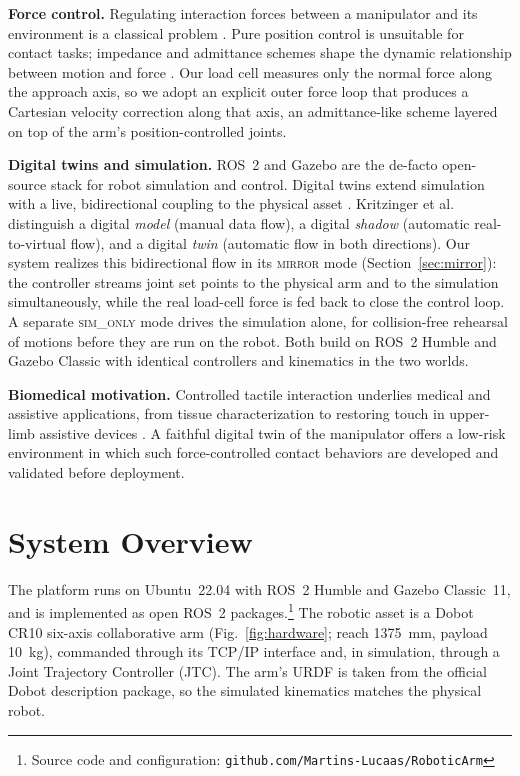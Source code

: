 \documentclass[conference]{IEEEtran}
\begin{document}
\textbf{Force control.} Regulating interaction forces between a manipulator and
its environment is a classical problem \cite{siciliano2009,hogan1985,villani2016}. Pure
position control is unsuitable for contact tasks; impedance and admittance
schemes shape the dynamic relationship between motion and force
\cite{hogan1985}. Our load cell measures only the normal force along the
approach axis, so we adopt an explicit outer force loop that produces a Cartesian
velocity correction along that axis, an admittance-like scheme layered on top of
the arm's position-controlled joints.

\textbf{Digital twins and simulation.} ROS~2 \cite{macenski2022} and Gazebo
\cite{koenig2004} are the de-facto open-source stack for robot simulation and
control. Digital twins extend simulation with a live, bidirectional coupling to
the physical asset \cite{grieves2017,tao2019}. Kritzinger et al.
\cite{kritzinger2018} distinguish a digital \emph{model} (manual data flow), a
digital \emph{shadow} (automatic real-to-virtual flow), and a digital \emph{twin}
(automatic flow in both directions). Our system realizes this bidirectional flow
in its \textsc{mirror} mode (Section~\ref{sec:mirror}): the controller streams
joint set points to the physical arm and to the simulation simultaneously, while
the real load-cell force is fed back to close the control loop. A separate
\textsc{sim\_only} mode drives the simulation alone, for collision-free rehearsal
of motions before they are run on the robot. Both build on ROS~2 Humble and
Gazebo Classic with identical controllers and kinematics in the two worlds.

\textbf{Biomedical motivation.} Controlled tactile interaction underlies medical
and assistive applications, from tissue characterization to restoring touch in
upper-limb assistive devices \cite{antfolk2013}. A faithful digital twin of the
manipulator offers a low-risk environment in which such force-controlled contact
behaviors are developed and validated before deployment.

\section{System Overview}
\label{sec:system}
The platform runs on Ubuntu~22.04 with ROS~2 Humble and Gazebo Classic~11, and is
implemented as open ROS~2 packages.\footnote{Source code and configuration:
\texttt{github.com/Martins-Lucaas/RoboticArm}} The
robotic asset is a Dobot CR10 six-axis collaborative arm (Fig.~\ref{fig:hardware};
reach \SI{1375}{\milli\meter}, payload \SI{10}{\kilo\gram}), commanded through its
TCP/IP interface and, in simulation, through a Joint Trajectory Controller (JTC). The arm's URDF is taken from the official Dobot
description package, so the simulated kinematics matches the physical robot.
\end{document}
